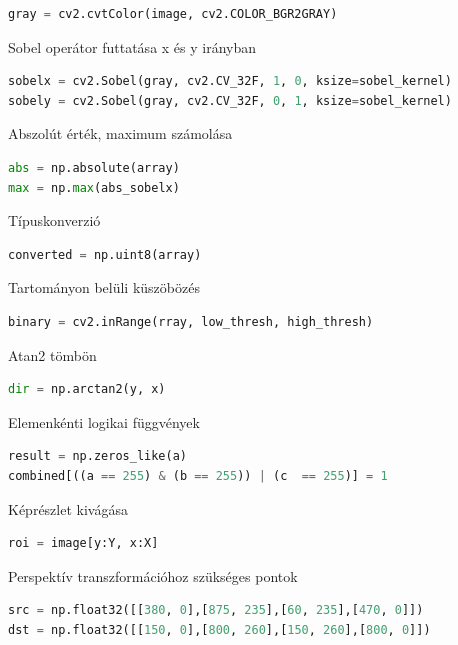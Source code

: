 \documentclass[12pt,a4paper,oneside]{report}             %
\begin{document}
\begin{lstlisting}[language=Python]
gray = cv2.cvtColor(image, cv2.COLOR_BGR2GRAY)
\end{lstlisting}

Sobel operátor futtatása x és y irányban

\begin{lstlisting}[language=Python]
sobelx = cv2.Sobel(gray, cv2.CV_32F, 1, 0, ksize=sobel_kernel)
sobely = cv2.Sobel(gray, cv2.CV_32F, 0, 1, ksize=sobel_kernel)
\end{lstlisting}

Abszolút érték, maximum számolása

\begin{lstlisting}[language=Python]
abs = np.absolute(array)
max = np.max(abs_sobelx)
\end{lstlisting}

Típuskonverzió

\begin{lstlisting}[language=Python]
converted = np.uint8(array)
\end{lstlisting}

Tartományon belüli küszöbözés

\begin{lstlisting}[language=Python]
binary = cv2.inRange(rray, low_thresh, high_thresh)
\end{lstlisting}

Atan2 tömbön

\begin{lstlisting}[language=Python]
dir = np.arctan2(y, x)
\end{lstlisting}

Elemenkénti logikai függvények

\begin{lstlisting}[language=Python]
result = np.zeros_like(a)
combined[((a == 255) & (b == 255)) | (c  == 255)] = 1
\end{lstlisting}

Képrészlet kivágása

\begin{lstlisting}[language=Python]
roi = image[y:Y, x:X]
\end{lstlisting}

Perspektív transzformációhoz szükséges pontok

\begin{lstlisting}[language=Python]
src = np.float32([[380, 0],[875, 235],[60, 235],[470, 0]])
dst = np.float32([[150, 0],[800, 260],[150, 260],[800, 0]])
\end{lstlisting}
\end{document}
